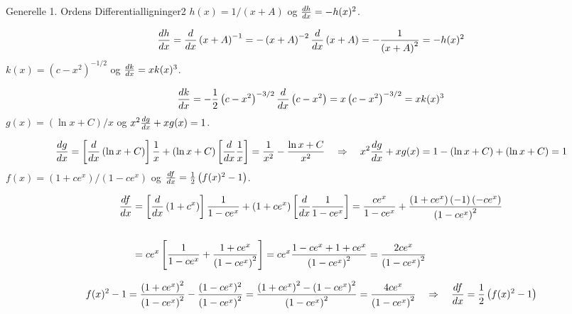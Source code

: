 \begin{opgave}{Generelle 1. Ordens Differentialligninger}{2}
\opg $h(x) = 1/ \left( x+A \right)$ og $\d{h}{x} = -h(x)^2$.

$$\d{h}{x} = \dl{\left( x+A \right)^{-1}}{x} = - \left( x+A \right)^{-2} \dl{\left( x+A \right)}{x} = - \frac{1}{\left( x + A \right)^2} = -h(x)^2$$
\vspace{2mm}
\opg $k(x) = \left( c-x^2 \right)^{-1/2}$ og $\d{k}{x} = x k(x)^3$.

$$\d{k}{x} = - \frac{1}{2} \left( c-x^2 \right)^{-3/2}  \dl{\left( c-x^2 \right)}{x} = x \left( c-x^2 \right)^{-3/2} = x k(x)^3$$
\vspace{2mm}
\opg $g(x) = \left( \ln x + C \right)/x$ og $x^2 \d{g}{x} + x g(x) = 1$.

$$\d{g}{x} = \left[ \dl{\left( \ln x + C \right)}{x} \right] \frac{1}{x} + \left( \ln x + C \right)  \left[ \dl{\frac{1}{x}}{x} \right]  = \frac{1}{x^2} - \frac{\ln x + C}{x^2} \quad \Rightarrow \quad x^2 \d{g}{x} + xg(x) = 1 - \left( \ln x + C \right) + \left( \ln x + C \right) = 1$$
\vspace{2mm}
\opg $f(x) = \left( 1+ce^x \right)/\left( 1-ce^x \right)$ og $\d{f}{x} = \frac{1}{2} \left( f(x)^2 -1 \right)$.

\begin{align*}
\d{f}{x} &= \left[ \dl{\left( 1+c^x \right)}{x} \right] \frac{1}{1-ce^x} + \left( 1+ce^x \right) \left[ \dl{\frac{1}{1-ce^x}}{x} \right] = \frac{ce^x}{1-ce^x} +  \frac{\left( 1+ce^x \right) \left( -1 \right) \left( -ce^x \right)}{\left( 1-ce^x \right)^2}\\\\
&= ce^x \left[ \frac{1}{1-ce^x} + \frac{1+ce^x}{\left( 1-ce^x \right)^2} \right] = ce^x \frac{1-ce^x + 1+ce^x}{\left( 1-ce^x \right)^2} = \frac{2ce^x}{\left( 1-ce^x \right)^2}
\end{align*}

$$f(x)^2 - 1  =  \frac{\left( 1+ce^x \right)^2}{\left( 1-ce^x \right)^2} - \frac{(1-ce^x)^2}{\left( 1-ce^x \right)^2} = \frac{\left( 1+ce^x \right)^2 - \left( 1-ce^x \right)^2}{\left( 1-ce^x \right)^2} = \frac{4ce^x}{\left( 1-ce^x \right)^2} \quad \Rightarrow \quad \d{f}{x} = \frac{1}{2} \left( f(x)^2 -1 \right)$$
\end{opgave}

